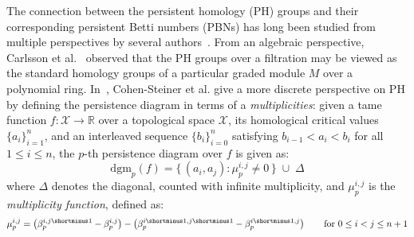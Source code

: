 \newcommand\restr[2]{{%
  \left.\kern-\nulldelimiterspace %
  #1 %
  \vphantom{\big|} %
  \right|_{#2} %
  }}
  

The connection between the persistent homology (PH) groups and their corresponding persistent Betti numbers (PBNs) has long been studied from multiple perspectives by several authors~\cite{cerri2013betti, chazal2016structure, cohen2005stability, zomorodian2004computing}.
From an algebraic perspective, Carlsson et al.~\cite{zomorodian2004computing} observed that the PH groups over a filtration may be viewed as the standard homology groups of a particular graded module $M$ over a polynomial ring. 
In~\cite{cohen2005stability}, Cohen-Steiner et al. give a more discrete perspective on PH by defining the persistence diagram in terms of a \emph{multiplicities}: given a tame function $f: \mathcal{X} \to \mathbb{R}$ over a topological space $\mathcal{X}$, its homological critical values $\{ a_i \}_{i=1}^n$, and an interleaved sequence $\{ b_i \}_{i=0}^n$ satisfying $b_{i-1} < a_i < b_i$ for all $1 \leq i \leq n$, the $p$-th persistence diagram over $f$ is given as: 
\begin{equation}
\mathrm{dgm}_p(f) = \{ \, (a_i, a_j) :  \mu_p^{i,j} \neq 0 \, \} \; \cup \; \Delta	
\end{equation}
where $\Delta$ denotes the diagonal, counted with infinite multiplicity, and $\mu_p^{i,j}$ is the  \emph{multiplicity function}, defined as: 
\begin{equation}\label{eq:multiplicity}
	\mu_p^{i,j} = \left(\beta_p^{i,j\shortminus1} - \beta_p^{i,j} \right) - \left(\beta_p^{i\shortminus1,j\shortminus1} - \beta_p^{i\shortminus1,j} \right) \quad\quad \text{for } 0 \leq i < j \leq n+ 1
\end{equation}
